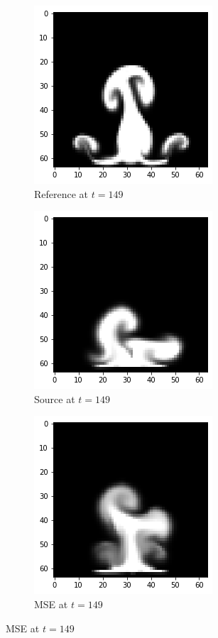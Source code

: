 \documentclass[a4paper,12pt,twoside]{report}
\begin{document}
	\begin{figure}
	\centering
	\begin{subfigure}{0.32\textwidth}
		\centering
		\includegraphics[scale=0.5]{buoyancy_low/ref}
		\caption{Reference at $t=149$}
	\end{subfigure}
	\begin{subfigure}{0.32\textwidth}
		\centering
		\includegraphics[scale=0.5]{buoyancy_low/source}
		\caption{Source at $t=149$}
	\end{subfigure}
	\begin{subfigure}{0.32\textwidth}
		\centering
		\includegraphics[scale=0.5]{buoyancy_low/mse}
		\caption{MSE at $t=149$}

\end{subfigure}
\end{figure}
\end{document}
